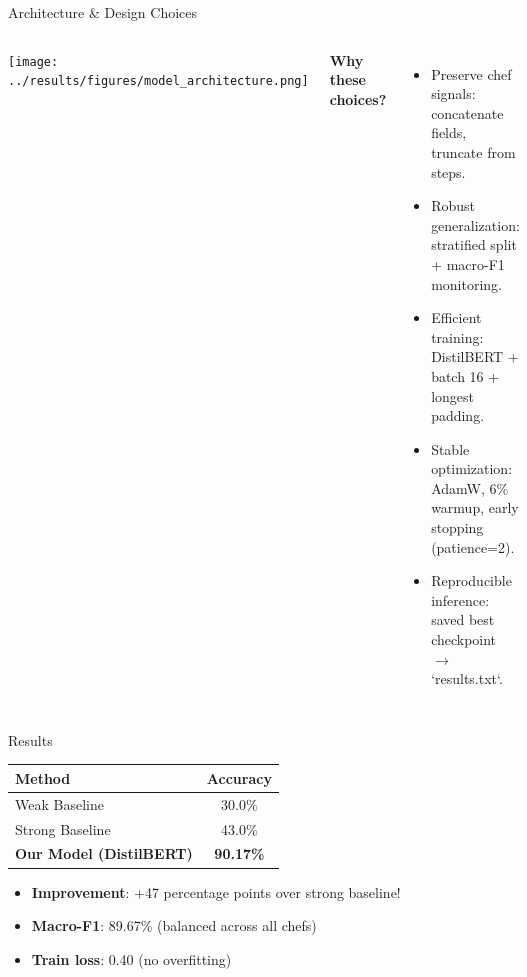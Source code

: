 \documentclass{beamer}
\begin{document}
\begin{frame}{Architecture \& Design Choices}
\begin{columns}[T]
\begin{center}
\texttt{[image: ../results/figures/model\_architecture.png]}
\end{center}

\small
\textbf{Why these choices?}
\begin{itemize}
    \item Preserve chef signals: concatenate fields, truncate from steps.
    \item Robust generalization: stratified split + macro-F1 monitoring.
    \item Efficient training: DistilBERT + batch 16 + longest padding.
    \item Stable optimization: AdamW, 6\% warmup, early stopping (patience=2).
    \item Reproducible inference: saved best checkpoint $\rightarrow$ `results.txt`.
\end{itemize}
\end{columns}
\end{frame}

\begin{frame}{Results}
\begin{table}
\centering
\begin{tabular}{lc}
\toprule
\textbf{Method} & \textbf{Accuracy} \\
\midrule
Weak Baseline & 30.0\% \\
Strong Baseline & 43.0\% \\
\textbf{Our Model (DistilBERT)} & \textbf{90.17\%} \\
\bottomrule
\end{tabular}
\end{table}

\vspace{0.5cm}

\begin{itemize}
    \item \textbf{Improvement}: +47 percentage points over strong baseline!
    \item \textbf{Macro-F1}: 89.67\% (balanced across all chefs)
    \item \textbf{Train loss}: 0.40 (no overfitting)
\end{itemize}
\end{frame}
\end{document}
